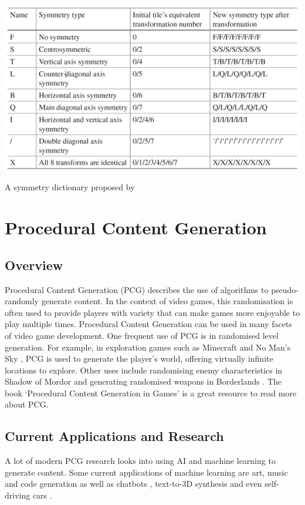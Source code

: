 \begin{table}[H]
        \centering
        \includegraphics[width=\textwidth, height=0.3\textheight, keepaspectratio]{Images/SymmetryDictionary.png}
        \caption{A symmetry dictionary proposed by \cite{WFC_Automatic_Rules_And_Better_Symmetries}}
        \label{fig:symmetryDictionary}
\end{table}

\section{Procedural Content Generation}
\subsection{Overview}
Procedural Content Generation (PCG) describes the use of algorithms to pseudo-randomly generate content. In the context of video games, this randomisation is often used to provide players with variety that can make games more enjoyable to play multiple times. Procedural Content Generation can be used in many facets of video game development. One frequent use of PCG is in randomised level generation. For example, in exploration games such as Minecraft \cite{minecraft} and No Man's Sky \cite{nomanssky}, PCG is used to generate the player's world, offering virtually infinite locations to explore. Other uses include randomising enemy characteristics in Shadow of Mordor \cite{shadowofmordor} and generating randomised weapons in Borderlands \cite{borderlands}. The book `Procedural Content Generation in Games' \cite{pcgbook} is a great resource to read more about PCG.

\subsection{Current Applications and Research}
A lot of modern PCG research looks into using AI and machine learning to generate content. Some current applications of machine learning are art, music and code generation as well as chatbots \cite{AIGC_Survey}, text-to-3D synthesis \cite{Magic3D} and even self-driving cars \cite{Self_Driving_Cars}.

